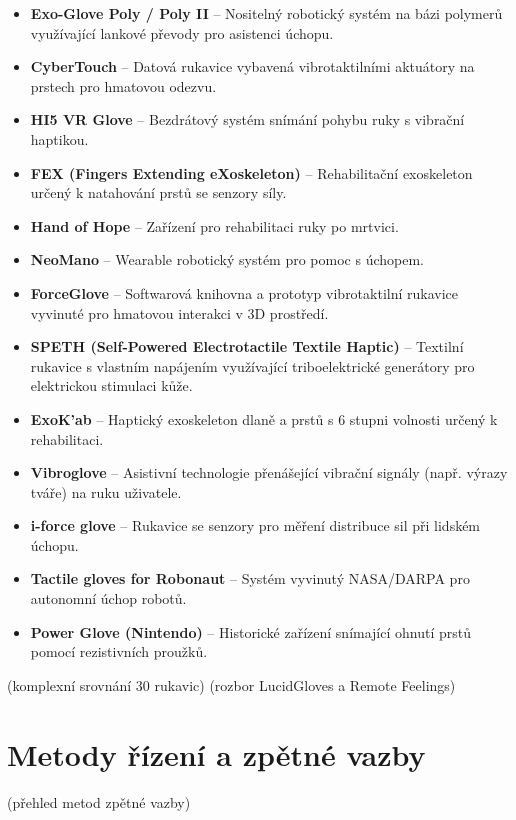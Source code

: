 \begin{itemize}
    \item \textbf{Exo-Glove Poly / Poly II} – Nositelný robotický systém na bázi polymerů využívající lankové převody pro asistenci úchopu.
    \item \textbf{CyberTouch} – Datová rukavice vybavená vibrotaktilními aktuátory na prstech pro hmatovou odezvu.
    \item \textbf{HI5 VR Glove} – Bezdrátový systém snímání pohybu ruky s vibrační haptikou.
    \item \textbf{FEX (Fingers Extending eXoskeleton)} – Rehabilitační exoskeleton určený k natahování prstů se senzory síly.
    \item \textbf{Hand of Hope} – Zařízení pro rehabilitaci ruky po mrtvici.
    \item \textbf{NeoMano} – Wearable robotický systém pro pomoc s úchopem.
    \item \textbf{ForceGlove} – Softwarová knihovna a prototyp vibrotaktilní rukavice vyvinuté pro hmatovou interakci v 3D prostředí.
    \item \textbf{SPETH (Self-Powered Electrotactile Textile Haptic)} – Textilní rukavice s vlastním napájením využívající triboelektrické generátory pro elektrickou stimulaci kůže.
    \item \textbf{ExoK’ab} – Haptický exoskeleton dlaně a prstů s 6 stupni volnosti určený k rehabilitaci.
    \item \textbf{Vibroglove} – Asistivní technologie přenášející vibrační signály (např. výrazy tváře) na ruku uživatele.
    \item \textbf{i-force glove} – Rukavice se senzory pro měření distribuce sil při lidském úchopu.
    \item \textbf{Tactile gloves for Robonaut} – Systém vyvinutý NASA/DARPA pro autonomní úchop robotů.
    \item \textbf{Power Glove (Nintendo)} – Historické zařízení snímající ohnutí prstů pomocí rezistivních proužků.
\end{itemize}
\cite{Belcamino2024} (komplexní srovnání 30 rukavic)
\cite{Krycner2024} (rozbor LucidGloves a Remote Feelings)
\cite{Nezval2011}
\cite{Zhang2025}
\cite{GIUDICI2025}
\cite{Giudici2024}
\cite{Li2025}

\section{Metody řízení a zpětné vazby}
\cite{Song2023823}
\cite{Tchimino2022920}
\cite{Trajlinek2021} (přehled metod zpětné vazby)
\cite{Sul2025627}
\cite{Ninu2014}
\cite{Dutta2002}
\cite{Xiong2024}